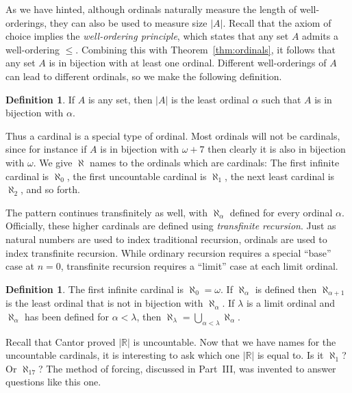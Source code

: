 \documentclass[11pt,oneside,a4paper]{amsbook}
\newcommand{\R}{\mathbb R}
\theoremstyle{definition}
\theoremstyle{plain}
\theoremstyle{definition}
\newtheorem{definition}[theorem]{Definition}
\theoremstyle{remark}
\numberwithin{equation}{section}
\numberwithin{figure}{section}
\begin{document}
As we have hinted, although ordinals naturally measure the length of well-orderings, they can also be used to measure size $|A|$. Recall that the axiom of choice implies the \emph{well-ordering principle}, which states that any set $A$ admits a well-ordering $\leq$. Combining this with Theorem~\ref{thm:ordinals}, it follows that any set $A$ is in bijection with at least one ordinal. Different well-orderings of $A$ can lead to different ordinals, so we make the following definition.

\begin{definition}
  If $A$ is any set, then $|A|$ is the least ordinal $\alpha$ such that $A$ is in bijection with $\alpha$.
\end{definition}

Thus a cardinal is a special type of ordinal. Most ordinals will not be cardinals, since for instance if $A$ is in bijection with $\omega+7$ then clearly it is also in bijection with $\omega$. We give $\aleph$ names to the ordinals which are cardinals: The first infinite cardinal is $\aleph_0$, the first uncountable cardinal is $\aleph_1$, the next least cardinal is $\aleph_2$, and so forth.

The pattern continues transfinitely as well, with $\aleph_\alpha$ defined for every ordinal $\alpha$. Officially, these higher cardinals are defined using \emph{transfinite recursion}. Just as natural numbers are used to index traditional recursion, ordinals are used to index transfinite recursion. While ordinary recursion requires a special ``base'' case at $n=0$, transfinite recursion requires a ``limit'' case at each limit ordinal.

\begin{definition}
  The first infinite cardinal is $\aleph_0=\omega$. If $\aleph_\alpha$ is defined then $\aleph_{\alpha+1}$ is the least ordinal that is not in bijection with $\aleph_\alpha$. If $\lambda$ is a limit ordinal and $\aleph_\alpha$ has been defined for $\alpha<\lambda$, then $\aleph_\lambda=\bigcup_{\alpha<\lambda}\aleph_\alpha$.
\end{definition}


Recall that Cantor proved $|\R|$ is uncountable. Now that we have names for the uncountable cardinals, it is interesting to ask which one $|\R|$ is equal to. Is it $\aleph_1$? Or $\aleph_{17}$? The method of forcing, discussed in Part~III, was invented to answer questions like this one.
\end{document}
